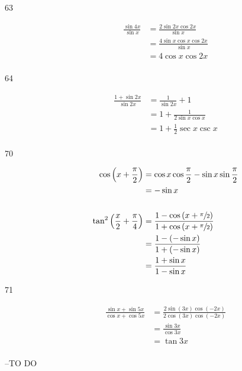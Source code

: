 \documentclass{exam}
\begin{document}
\begin{description}
      \item[63]
        \begin{align*}
          \frac{\sin 4x}{\sin x} & = \frac{2 \sin 2x \cos 2x}{\sin x} \\
                                 & = \frac{4 \sin x \cos x \cos 2x}{\sin x} \\
                                 & = 4 \cos x \cos 2x \\
        \end{align*}

      \item[64]
        \begin{align*}
          \frac{1 + \sin 2x}{\sin 2x} & = \frac{1}{\sin 2x} + 1 \\
                                      & = 1 + \frac{1}{2 \sin x \cos x} \\
                                      & = 1 + \frac{1}{2} \sec x \csc x \\
        \end{align*}

      \item[70]
        \begin{align*}
          \cos \left( x + \frac{\pi}{2} \right) & = \cos x \cos \frac{\pi}{2} - \sin x \sin \frac{\pi}{2} \\
                                                & = - \sin x \\
          \\
          \tan^2 \left( \frac{x}{2} + \frac{\pi}{4} \right) 
            &= \frac{1 - \cos \left( x + \sfrac{\pi}{2} \right)}{1 + \cos \left( x + \sfrac{\pi}{2} \right)} \\
            &= \frac{1 - (- \sin x)}{1 + (- \sin x)} \\
            &= \frac{1 + \sin x}{1 - \sin x} \\
        \end{align*}

      \item[71]
        \begin{align*}
          \frac{\sin x + \sin 5x}{\cos x + \cos 5x} & = \frac{2 \sin (3x) \cos (-2x)}{2 \cos(3x) \cos (-2x)} \\
                                                    & = \frac{\sin 3x}{\cos 3x} \\
                                                    & = \tan 3x \\
        \end{align*}

    \end{description}

  \else
    \vspace{5 cm}

    \begin{quote}
      \begin{em}
      \end{em}
    \end{quote}
    \hspace{1 cm} --TO DO
  \fi
\end{document}
